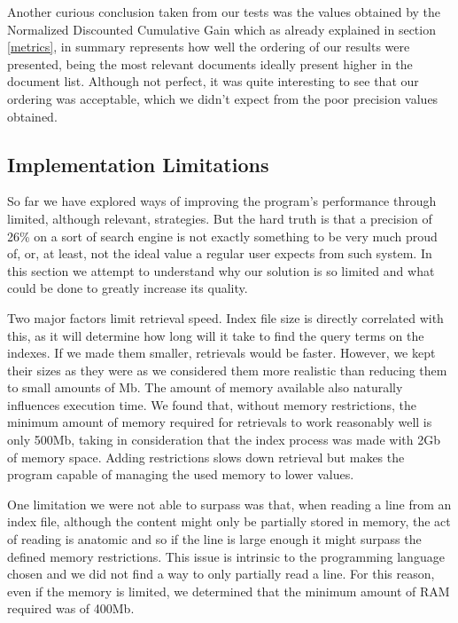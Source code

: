 \documentclass[12pt]{article}
\begin{document}
Another curious conclusion taken from our tests was the values obtained by the 
Normalized Discounted Cumulative Gain which as already explained in section 
\ref{metrics}, in summary represents how well the ordering of our results were 
presented, being the most relevant documents ideally present higher in the 
document list. 
Although not perfect, it was quite interesting to see that our ordering was 
acceptable, which we didn't expect from the poor precision values obtained.

\subsection{Implementation Limitations} \label{limitations}

So far we have explored ways of improving the program's performance through
limited, although relevant, strategies.
But the hard truth is that a precision of 26\% on a sort of search engine is not
exactly something to be very much proud of, or, at least, not the ideal value 
a regular user expects from such system.
In this section we attempt to understand why our solution is so limited and 
what could be done to greatly increase its quality.

Two major factors limit retrieval speed.
Index file size is directly correlated with this, as it will determine how long
will it take to find the query terms on the indexes. 
If we made them smaller, retrievals would be faster.
However, we kept their sizes as they were as we considered them more realistic 
than reducing them to small amounts of Mb.
The amount of memory available also naturally influences execution time.
We found that, without memory restrictions, the minimum amount of memory required 
for retrievals to work reasonably well is only 500Mb, taking in consideration 
that the index process was made with 2Gb of memory space.
Adding restrictions slows down retrieval but makes the program capable of managing
the used memory to lower values. 

One limitation we were not able to surpass was that, when reading a line from an 
index file, although the content might only be partially stored in memory, the act
of reading is anatomic and so if the line is large enough it might surpass the 
defined memory restrictions.
This issue is intrinsic to the programming language chosen and we did not find a 
way to only partially read a line.
For this reason, even if the memory is limited, we determined that the minimum 
amount of RAM required was of 400Mb.
\end{document}
